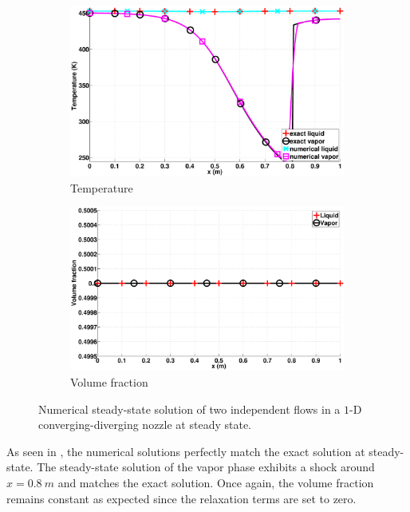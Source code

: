 \documentclass[preprint,10pt]{elsarticle}
\begin{document}
\begin{figure}[H]
        \begin{subfigure}[b]{0.495\textwidth}
                \centering
                \includegraphics[width=\textwidth]{figures/nozzle-indep-phase_two_phases_temperature.eps}
                \caption{Temperature}
                \label{fig:nozzle-indep-density}
        \end{subfigure}
        \begin{subfigure}[b]{0.495\textwidth}
                \centering
                \includegraphics[width=\textwidth]{figures/nozzle-indep-phase_two_phases_volume_fraction.eps}
                \caption{Volume fraction}
                \label{fig:nozzle-indep-vf}
        \end{subfigure}
        \caption{Numerical steady-state solution of two independent flows in a $1$-D converging-diverging nozzle at steady state.}\label{fig:nozzle-indep-variables}
\end{figure}
%
As seen in , the numerical solutions perfectly match the exact solution at steady-state. The steady-state solution of the vapor phase exhibits a shock around $x=0.8 \ m$ and matches the exact solution. Once again, the volume fraction remains constant as expected since the relaxation terms are set to zero. 
\end{document}
